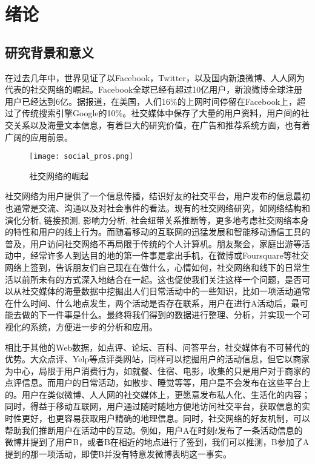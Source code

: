 \chapter{绪论}
\section{研究背景和意义}
在过去几年中，世界见证了以Facebook，Twitter，以及国内新浪微博、人人网为代表的社交网络的崛起。Facebook全球已经有超过10亿用户，新浪微博全球注册用户已经达到6亿。据报道，在美国，人们16\%的上网时间停留在Facebook上，超过了传统搜索引擎Google的10\%。社交媒体中保存了大量的用户资料，用户间的社交关系以及海量文本信息，有着巨大的研究价值，在广告和推荐系统方面，也有着广阔的应用前景。

\begin{figure}[!h]
\centering
\texttt{[image: social\_pros.png]}
\caption{社交网络的崛起}
\end{figure}

社交网络为用户提供了一个信息传播，结识好友的社交平台，用户发布的信息最初也通常是交流、沟通以及对社会事件的看法。现有的社交网络研究，如网络结构和演化分析\cite{leskovec2008microscopic}, 链接预测\cite{liben2007link}, 影响力分析\cite{tang2009social}, 社会纽带关系推断\cite{tang2011learning}等，更多地考虑社交网络本身的特性和用户的线上行为。而随着移动的互联网的迅猛发展和智能移动通信工具的普及，用户访问社交网络不再局限于传统的个人计算机。朋友聚会，家庭出游等活动中，经常许多人到达目的地的第一件事是拿出手机，在微博或Foursquare等社交网络上签到，告诉朋友们自己现在在做什么，心情如何，社交网络和线下的日常生活以前所未有的方式深入地结合在一起。这也促使我们关注这样一个问题，是否可以从社交媒体的海量数据中挖掘出人们日常活动中的一些知识，比如一项活动通常在什么时间、什么地点发生，两个活动是否存在联系，用户在进行A活动后，最可能去做的下一件事是什么。最终将我们得到的数据进行整理、分析，并实现一个可视化的系统，方便进一步的分析和应用。

相比于其他的Web数据，如点评、论坛、百科、问答平台，社交媒体有不可替代的优势。大众点评、Yelp等点评类网站，同样可以挖掘用户的活动信息，但它以商家为中心，局限于用户消费行为，如就餐、住宿、电影，收集的只是用户对于商家的点评信息。而用户的日常活动，如散步、睡觉等等，用户是不会发布在这些平台上的。用户在类似微博、人人网的社交媒体上，更愿意发布私人化、生活化的内容；同时，得益于移动互联网，用户通过随时随地方便地访问社交平台，获取信息的实时性更好，也更容易获取用户精确的地理信息。同时，社交网络的好友机制，可以帮助我们推断用户在活动中的互动。例如，用户A在时刻$t$发布了一条活动信息的微博并提到了用户B，或者B在相近的地点进行了签到，我们可以推测，B参加了A提到的那一项活动，即使B并没有特意发微博表明这一事实。

